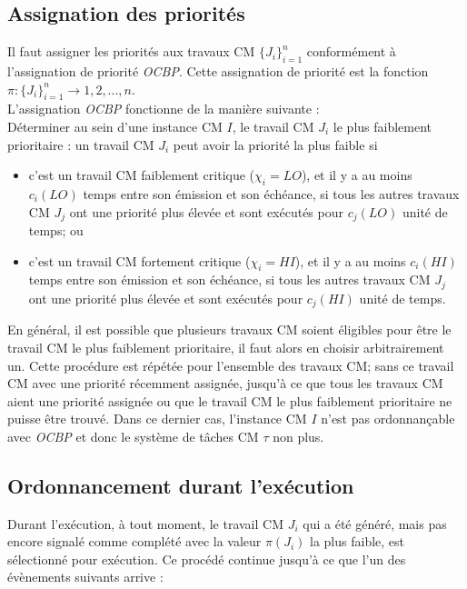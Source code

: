 \documentclass[12pt,a4paper,oneside]{book}
\theoremstyle{break}
\theoremstyle{breakplain}
\begin{document}
\subsection{Assignation des priorités}
Il faut assigner les priorités aux travaux CM $\{J_i\}^n_{i=1}$ conformément à l'assignation de priorité \textit{OCBP}. Cette assignation de priorité est la fonction $\pi : \{J_i\}^n_{i=1} \rightarrow {1,2,...,n}$.\\

L'assignation \textit{OCBP} fonctionne de la manière suivante :\\

Déterminer au sein d'une instance CM $I$, le travail CM $J_i$ le plus faiblement prioritaire : un travail CM $J_i$ peut avoir la priorité la plus faible si

\begin{itemize}
\item c'est un travail CM faiblement critique ($\chi_i = LO$), et il y a au moins $c_i(LO)$ temps entre son émission et son échéance, si tous les autres travaux CM $J_j$ ont une priorité plus élevée et sont exécutés pour $c_j(LO)$ unité de temps; ou
\item c'est un travail CM fortement critique ($\chi_i = HI$), et il y a au moins $c_i(HI)$ temps entre son émission et son échéance, si tous les autres travaux CM $J_j$ ont une priorité plus élevée et sont exécutés pour $c_j(HI)$ unité de temps.
\end{itemize}

En général, il est possible que plusieurs travaux CM soient éligibles pour être le travail CM le plus faiblement prioritaire, il faut alors en choisir arbitrairement un. Cette procédure est répétée pour l'ensemble des travaux CM; sans ce travail CM avec une priorité récemment assignée, jusqu'à ce que tous les travaux CM aient une priorité assignée ou que le travail CM le plus faiblement prioritaire ne puisse être trouvé. Dans ce dernier cas, l'instance CM $I$ n'est pas ordonnançable avec \textit{OCBP} et donc le système de tâches CM $\tau$ non plus.

\subsection{Ordonnancement durant l'exécution}
Durant l'exécution, à tout moment, le travail CM $J_i$ qui a été généré, mais pas encore signalé comme complété avec la valeur $\pi(J_i)$ la plus faible, est sélectionné pour exécution. Ce procédé continue jusqu'à ce que l'un des évènements suivants arrive :
\end{document}
